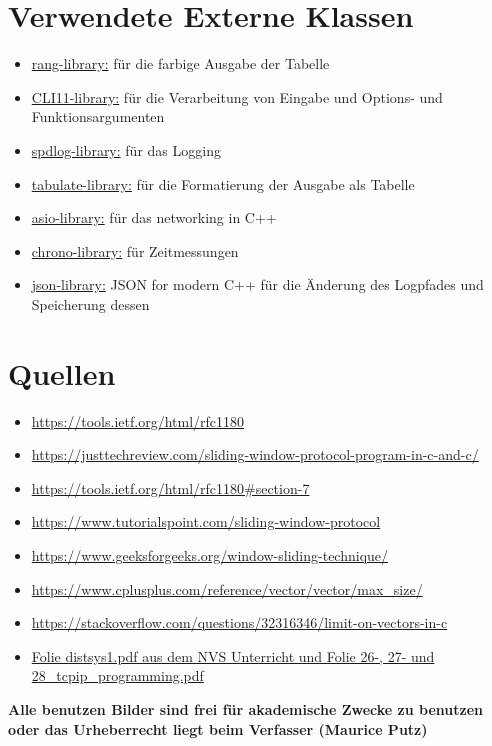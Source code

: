 \documentclass{article}
\begin{document}
\break

\section{Verwendete Externe Klassen}
\begin{itemize}
	\item \underline{rang-library:} für die farbige Ausgabe der Tabelle
	\item \underline{CLI11-library:} für die Verarbeitung von Eingabe und Options- und Funktionsargumenten
	\item \underline{spdlog-library:} für das Logging
	\item \underline{tabulate-library:} für die Formatierung der Ausgabe als Tabelle
	\item \underline{asio-library:} für das networking in C++
	\item \underline{chrono-library:} für Zeitmessungen
	\item \underline{json-library:} JSON for modern C++ für die Änderung des Logpfades und Speicherung dessen
\end{itemize}


\section{Quellen}

\begin{itemize}
	\item \underline{https://tools.ietf.org/html/rfc1180}
	\item \underline{https://justtechreview.com/sliding-window-protocol-program-in-c-and-c/}
	\item \underline{https://tools.ietf.org/html/rfc1180\#section-7}
	\item \underline{https://www.tutorialspoint.com/sliding-window-protocol}
	\item \underline{https://www.geeksforgeeks.org/window-sliding-technique/}
	\item \underline{https://www.cplusplus.com/reference/vector/vector/max\_size/}
	\item \underline{https://stackoverflow.com/questions/32316346/limit-on-vectors-in-c}
	\item \underline{Folie distsys1.pdf aus dem NVS Unterricht und Folie 26-, 27- und 28\_tcpip\_programming.pdf}
\end{itemize}

\textbf{Alle benutzen Bilder sind frei für akademische Zwecke zu benutzen oder das Urheberrecht liegt beim Verfasser (Maurice Putz)}
\end{document}

